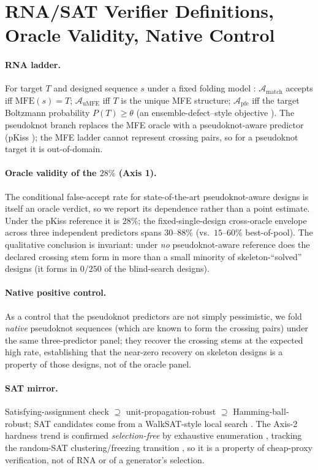 \documentclass[letterpaper]{article} %
\newcommand{\match}{\ensuremath{\mathcal{A}_{\mathrm{match}}}}
\newcommand{\umfe}{\ensuremath{\mathcal{A}_{\mathrm{uMFE}}}}
\newcommand{\pfe}{\ensuremath{\mathcal{A}_{\mathrm{pfe}}}}
\newcommand{\PT}{\ensuremath{P(T)}}
\begin{document}
\section{RNA/SAT Verifier Definitions, Oracle Validity, Native Control}\label{supp:rnasat}
\paragraph{RNA ladder.} For target $T$ and designed sequence $s$ under a fixed folding model
\citep{lorenz2011viennarna}: $\match$ accepts iff $\mathrm{MFE}(s)=T$; $\umfe$ iff $T$ is the unique MFE
structure; $\pfe$ iff the target Boltzmann probability $\PT\ge\theta$ (an ensemble-defect--style objective
\citep{zadeh2011nupack}). The pseudoknot branch replaces the MFE oracle with a pseudoknot-aware predictor
(pKiss \citep{janssen2015pkiss}); the MFE ladder cannot represent crossing pairs, so for a pseudoknot target
it is out-of-domain.
\paragraph{Oracle validity of the $28\%$ (Axis 1).} The conditional false-accept rate for state-of-the-art
pseudoknot-aware designs \citep{wirecki2025desirna} is itself an oracle verdict, so we report its dependence
rather than a point estimate. Under the pKiss reference it is $28\%$; the fixed-single-design cross-oracle
envelope across three independent predictors spans $30$--$88\%$ (vs.\ $15$--$60\%$ best-of-pool). The
qualitative conclusion is invariant: under \emph{no} pseudoknot-aware reference does the declared crossing
stem form in more than a small minority of skeleton-``solved'' designs (it forms in $0/250$ of the
blind-search designs). \paragraph{Native positive control.} As a control that the pseudoknot predictors are
not simply pessimistic, we fold \emph{native} pseudoknot sequences (which are known to form the crossing
pairs) under the same three-predictor panel; they recover the crossing stems at the expected high rate,
establishing that the near-zero recovery on skeleton designs is a property of those designs, not of the
oracle panel. \paragraph{SAT mirror.} Satisfying-assignment check $\supseteq$ unit-propagation-robust
$\supseteq$ Hamming-ball-robust; SAT candidates come from a WalkSAT-style local search
\citep{selman1994walksat}. The Axis-2 hardness trend is confirmed \emph{selection-free} by exhaustive
enumeration \citep{ardelius2008exhaustive}, tracking the random-SAT clustering/freezing transition
\citep{krzakala2007clustering,zhou2008frozen}, so it is a property of cheap-proxy verification, not of RNA or
of a generator's selection.
\end{document}
